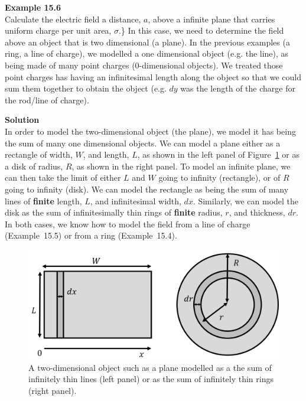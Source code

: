 \begin{framed}
\textbf{Example 15.6}\\
Calculate the electric field a distance, $a$, above a infinite plane that carries uniform charge per unit area, $\sigma$.\}
In this case, we need to determine the field above an object that is two dimensional (a plane). In the previous examples (a ring, a line of charge), we modelled a one dimensional object (e.g. the line), as being made of many point charges (0-dimensional objects). We treated those point charges has having an infinitesimal length along the object so that we could sum them together to obtain the object (e.g. $dy$ was the length of the charge for the rod/line of charge).

\begin{framed}
\textbf{Solution}\\
In order to model the two-dimensional object (the plane), we model it has being the sum of many one dimensional objects. We can model a plane either as a rectangle of width, $W$, and length, $L$, as shown in the left panel of Figure~\ref{fig:chargesfields:planecharge} or as a disk of radius, $R$, as shown in the right panel. To model an infinite plane, we can then take the limit of either $L$ and $W$ going to infinity (rectangle), or of $R$ going to infinity (disk). We can model the rectangle as being the sum of many lines of \textbf{finite} length, $L$, and infinitesimal width, $dx$. Similarly, we can model the disk as the sum of infinitesimally thin rings of \textbf{finite} radius, $r$, and thickness, $dr$. In both cases, we know how to model the field from a line of charge (Example~15.5) or from a ring (Example~15.4).

\begin{figure}[!htbp]
\centering
\includegraphics[width=0.7\linewidth]{files/planecharge-ef931468f92f58cf31fa48dcf255be7e.png}
\caption[]{A two-dimensional object such as a plane modelled as a the sum of infinitely thin lines (left panel) or as the sum of infinitely thin rings (right panel).}
\label{fig:chargesfields:planecharge}
\end{figure}


\end{framed}
\end{framed}
